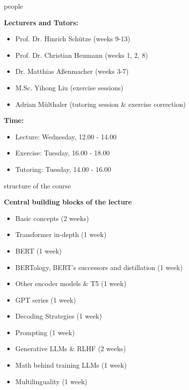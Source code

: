 \documentclass[11pt,compress,t,notes=noshow, xcolor=table]{beamer}
\begin{document}


\begin{frame}{people}

\vfill

\textbf{Lecturers and Tutors:}

	\begin{itemize}
		\item Prof. Dr. Hinrich Schütze (weeks 9-13)
		\item Prof. Dr. Christian Heumann (weeks 1, 2, 8)
		\item Dr. Matthias Aßenmacher (weeks 3-7)
		\item M.Sc. Yihong Liu (exercise sessions)
		\item Adrian Mülthaler (tutoring session \& exercise correction)
	\end{itemize}

\textbf{Time:}

	\begin{itemize}
		\item Lecture: Wednesday, 12.00 - 14.00
		\item Exercise: Tuesday, 16.00 - 18.00
		\item Tutoring: Tuesday, 14.00 - 16.00
	\end{itemize}

\vfill

\end{frame}



\begin{frame}{structure of the course}

\vfill

\textbf{Central building blocks of the lecture}

	\begin{itemize}
		\item Basic concepts (2 weeks)
		\item Transformer in-depth (1 week)
		\item BERT (1 week)
		\item BERTology, BERT's successors and distillation (1 week)
		\item Other encoder models \& T5 (1 week)
		\item GPT series (1 week)
		\item Decoding Strategies (1 week)
		\item Prompting (1 week)
		\item Generative LLMs \& RLHF (2 weeks)
		\item Math behind training LLMs (1 week)
		\item Multilinguality (1 week)
	\end{itemize}

\vfill

\end{frame}
\end{document}

